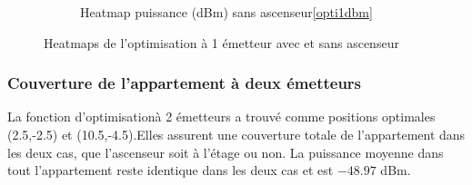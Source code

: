 \begin{figure}[H]
\begin{subfigure}[b]{0.48\textwidth}
    \caption{Heatmap puissance (dBm) sans ascenseur\ref{opti1dbm}}
    \label{fig:}
\end{subfigure}
\caption{Heatmaps de l'optimisation à 1 émetteur avec et sans ascenseur }
\label{okem}
\end{figure}
\subsubsection{Couverture de l'appartement à deux émetteurs}
La fonction d'optimisationà 2 émetteurs a trouvé comme positions optimales (2.5,-2.5) et (10.5,-4.5).Elles assurent une couverture totale de l'appartement dans les deux cas, que l'ascenseur soit à l'étage ou non. La puissance moyenne dans tout l'appartement reste identique dans les deux cas et est  $-48.97$ dBm. %
